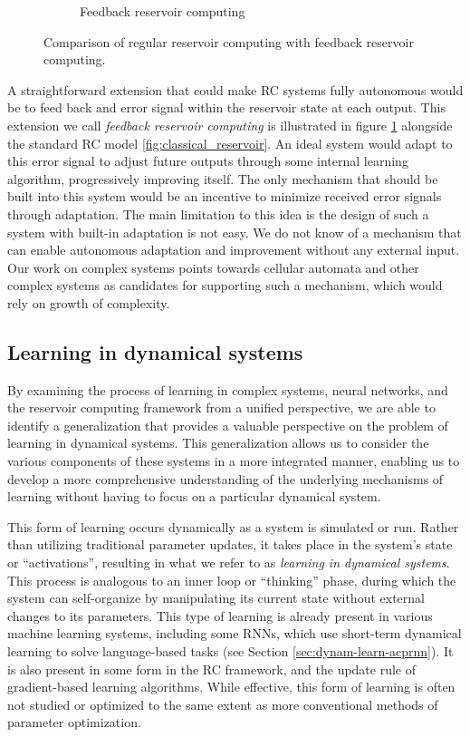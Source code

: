 \begin{figure}[htbp]
\begin{subfigure}[t]{.45\linewidth}
    \caption{Feedback reservoir computing}
    \label{fig:feedback_reservoir}
  \end{subfigure}
  \caption{Comparison of regular reservoir computing with feedback reservoir
    computing.}
  \label{"waiting for reftex-label call..."}
\end{figure}

A straightforward extension that could make \ac{RC} systems fully autonomous
would be to feed back and error signal within the reservoir state at each
output. This extension we call \emph{feedback reservoir computing} is
illustrated in figure \ref{fig:feedback_reservoir} alongside the standard
\ac{RC} model \ref{fig:classical_reservoir}. An ideal system would adapt to this
error signal to adjust future outputs through some internal learning algorithm,
progressively improving itself. The only mechanism that should be built into
this system would be an incentive to minimize received error signals through
adaptation. The main limitation to this idea is the design of such a system with
built-in adaptation is not easy. We do not know of a mechanism that can enable
autonomous adaptation and improvement without any external input. Our work on
complex systems points towards cellular automata and other complex systems as
candidates for supporting such a mechanism, which would rely on growth of
complexity.

\subsection{Learning in dynamical systems}

By examining the process of learning in complex systems, neural networks, and
the reservoir computing framework from a unified perspective, we are able to
identify a generalization that provides a valuable perspective on the problem of
learning in dynamical systems. This generalization allows us to consider the
various components of these systems in a more integrated manner, enabling us to
develop a more comprehensive understanding of the underlying mechanisms of
learning without having to focus on a particular dynamical system.

This form of learning occurs dynamically as a system is simulated or run. Rather
than utilizing traditional parameter updates, it takes place in the system's
state or ``activations'', resulting in what we refer to as \emph{learning in
  dynamical systems}. This process is analogous to an inner loop or ``thinking''
phase, during which the system can self-organize by manipulating its current
state without external changes to its parameters. This type of learning is
already present in various machine learning systems, including some \acfp{RNN},
which use short-term dynamical learning to solve language-based tasks (see
Section \ref{sec:dynam-learn-acprnn}). It is also present in some form in the
\ac{RC} framework, and the update rule of gradient-based learning algorithms.
While effective, this form of learning is often not studied or optimized to the
same extent as more conventional methods of parameter optimization.

